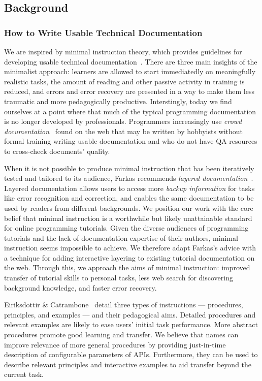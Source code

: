 \subsection{Background}

\subsubsection{How to Write Usable Technical Documentation}

We are inspired by minimal instruction theory, which provides guidelines for developing usable technical documentation~\cite{carroll_nurnberg_1990}.
There are three main insights of the minimalist approach:
learners are allowed to start immediatedly on meaningfully realistic tasks,
the amount of reading and other passive activity in training is reduced,
and errors and error recovery are presented in a way to make them less traumatic and more pedagogically productive.
Interstingly, today we find ourselves at a point where that much of the typical programming documentation is no longer developed by professionals.
Programmers increasingly use \emph{crowd documentation}~\cite{parnin_measuring_2011} found on the web that may be written by hobbyists without formal training writing usable documentation and who do not have QA resources to cross-check documents' quality.

When it is not possible to produce minimal instruction that has been iteratively tested and tailored to its audience, Farkas recommends \emph{layered documentation}~\cite{farkas_layering_1998}.
Layered documentation allows users to access more \emph{backup information} for tasks like error recognition and correction, and enables the same documentation to be used by readers from different backgrounds.
We position our work with the core belief that minimal instruction is a worthwhile but likely unattainable standard for online programming tutorials.
Given the diverse audiences of programming tutorials and the lack of documentation expertise of their authors, minimal instruction seems impossible to achieve.
We therefore adapt Farkas's advice with a technique for adding interactive layering to existing tutorial documentation on the web.
Through this, we approach the aims of minimal instruction: improved transfer of tutorial skills to personal tasks, less web search for discovering background knowledge, and faster error recovery.

Eiriksdottir \& Catrambone~\cite{eiriksdottir_procedural_2011} detail three types of instructions --- procedures, principles, and examples --- and their pedagogical aims.
Detailed procedures and relevant examples are likely to ease users' initial task performance.
More abstract procedures promote good learning and transfer.
We believe that \glspl{name} can improve relevance of more general procedures by providing just-in-time description of configurable parameters of APIs.
Furthermore, they can be used to describe relevant principles and interactive examples to aid transfer beyond the current task.

